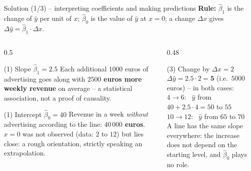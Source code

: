 \documentclass[aspectratio=169,11pt]{beamer}
\begin{document}
\begin{frame}{Solution (1/3) -- interpreting coefficients and making predictions}
  \small
  \textbf{Rule:} $\hat{\beta}_1$ is the change of $\hat{y}$ per unit of $x$;
  $\hat{\beta}_0$ is the value of $\hat{y}$ at $x = 0$; a change $\Delta x$
  gives $\Delta \hat{y} = \hat{\beta}_1 \cdot \Delta x$.
  \medskip

  \begin{columns}[T]
    \begin{column}{0.5\textwidth}
      \begin{block}{(1) Slope $\hat{\beta}_1 = 2.5$}
        Each additional $1000$ euros of advertising goes along with
        \textbf{$2500$ euros more weekly revenue} on average -- a statistical
        association, not a proof of causality.
      \end{block}
      \begin{block}{(1) Intercept $\hat{\beta}_0 = 40$}
        Revenue in a week \emph{without} advertising according to the line:
        \textbf{$40\,000$ euros}. $x = 0$ was not observed (data: $2$ to $12$)
        but lies close: a rough orientation, strictly speaking an
        extrapolation.
      \end{block}
    \end{column}
    \begin{column}{0.48\textwidth}
      \begin{exampleblock}{(3) Change by $\Delta x = 2$}
        $\Delta \hat{y} = 2.5 \cdot 2 = \mathbf{5}$ (i.e.\ $5000$ euros) -- in
        both cases:\\[2pt]
        $4 \to 6$: \ $\hat{y}$ from $40 + 2.5 \cdot 4 = 50$ to $55$\\
        $10 \to 12$: \ $\hat{y}$ from $65$ to $70$\\[2pt]
        A line has the same slope everywhere: the increase does not depend on
        the starting level, and $\hat{\beta}_0$ plays no role.
      \end{exampleblock}
    \end{column}
  \end{columns}
\end{frame}
\end{document}
